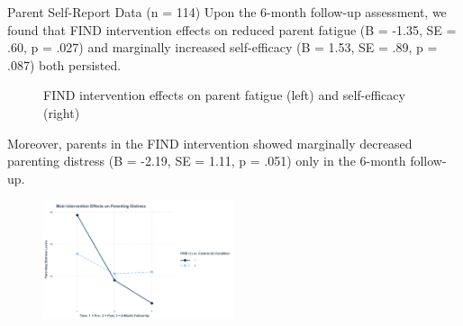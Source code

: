 \documentclass[final]{beamer}
\newlength{\colwidth}
\begin{document}
\begin{frame}[t]
\begin{columns}[t]
\begin{column}{\colwidth}
\begin{block}{Parent Self-Report Data (n = 114)}
    Upon the 6-month follow-up assessment, we found that FIND intervention effects on reduced parent fatigue (B = -1.35, SE = .60, p = .027) and marginally increased self-efficacy (B = 1.53, SE = .89, p = .087) both persisted. 
    
    \begin{figure}[ht]
        \centering
        \caption{FIND intervention effects on parent fatigue (left) and self-efficacy (right)}
        \label{fig:combined}
    \end{figure} 
    
    Moreover, parents in the FIND intervention showed marginally decreased parenting distress (B = -2.19, SE = 1.11, p = .051) only in the 6-month follow-up. 
    
    \begin{figure}[ht]
        \centering
          \includegraphics[clip, width=0.5\textwidth]{distress.png}
          \label{fig:distress}
    \end{figure}
    

\end{block}
\end{column}
\end{columns}
\end{frame}
\end{document}
